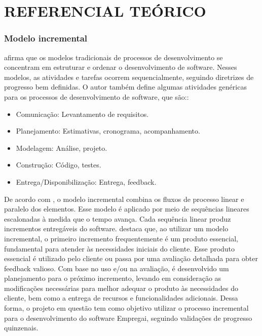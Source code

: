 \chapter{REFERENCIAL TEÓRICO}\label{cap:desenvolvimento}

\subsection{Modelo incremental}

\textcite{Pressman2016} afirma que os modelos tradicionais de processos de desenvolvimento se concentram em estruturar e ordenar o desenvolvimento de 
software. Nesses modelos, as atividades e tarefas ocorrem sequencialmente, seguindo diretrizes de progresso bem definidas. O autor também define algumas 
atividades genéricas para os processos de desenvolvimento de software, que são::
\begin{itemize}[label=$\bullet$]
	\item Comunicação: Levantamento de requisitos.
	\item Planejamento: Estimativas, cronograma, acompanhamento.
	\item Modelagem: Análise, projeto.
	\item Construção: Código, testes.
	\item Entrega/Disponibilização: Entrega, feedback.
	\end{itemize}
	De acordo com \textcite{Pressman2016}, o modelo incremental combina os fluxos de processo linear e paralelo dos elementos. Esse modelo é aplicado por
	meio de sequências lineares escalonadas à medida que o tempo avança. Cada sequência linear produz incrementos entregáveis do software. \newline
	\textcite{Pressman2016} destaca que, ao utilizar um modelo incremental, o primeiro incremento frequentemente é um produto essencial, fundamental 
	para atender às necessidades iniciais do cliente. Esse produto essencial é utilizado pelo cliente ou passa por uma avaliação detalhada para obter feedback valioso. 
	Com base no uso e/ou na avaliação, é desenvolvido um planejamento para o próximo incremento, levando em consideração as modificações necessárias para melhor adequar o 
	produto às necessidades do cliente, bem como a entrega de recursos e funcionalidades adicionais.
	\newline Dessa forma, o projeto em questão tem como objetivo utilizar o processo incremental para o desenvolvimento do software Empregai, seguindo validações de progresso quinzenais.
	
